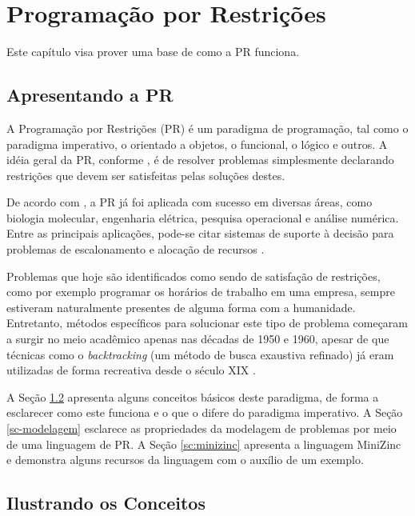 \chapter{Programação por Restrições}\label{cp:pr}


Este capítulo visa prover uma base de como a PR funciona.


\section{Apresentando a PR}

A Programação por Restrições (PR) é um paradigma de programação, tal como o paradigma imperativo, o orientado a objetos, o funcional, o lógico e outros. A idéia geral da PR, conforme \cite{thom}, é de resolver problemas simplesmente declarando restrições que devem ser satisfeitas pelas soluções destes.

De acordo com \cite{apt}, a PR já foi aplicada com sucesso em diversas áreas, como biologia molecular, engenharia elétrica, pesquisa operacional e análise numérica. Entre as principais aplicações, pode-se citar sistemas de suporte à decisão para problemas de escalonamento e alocação de recursos \cite{thom}.

Problemas que hoje são identificados como sendo de satisfação de restrições, como por exemplo programar os horários de trabalho em uma empresa, sempre estiveram naturalmente presentes de alguma forma com a humanidade. Entretanto, métodos específicos para solucionar este tipo de problema começaram a surgir no meio acadêmico apenas nas décadas de 1950 e 1960, apesar de que técnicas como o \textit{backtracking} (um método de busca exaustiva refinado) já eram utilizadas de forma recreativa desde o século XIX \cite{cphandbook}.

A Seção \ref{sc-conceitos-basicos-pr} apresenta alguns conceitos básicos deste paradigma, de forma a esclarecer como este funciona e o que o difere do paradigma imperativo. A Seção \ref{sc-modelagem} esclarece as propriedades da modelagem de problemas por meio de uma linguagem de PR. A Seção \ref{sc:minizinc} apresenta a linguagem MiniZinc e demonstra alguns recursos da linguagem com o auxílio de um exemplo.



\section{Ilustrando os Conceitos}
\label{sc-conceitos-basicos-pr}

